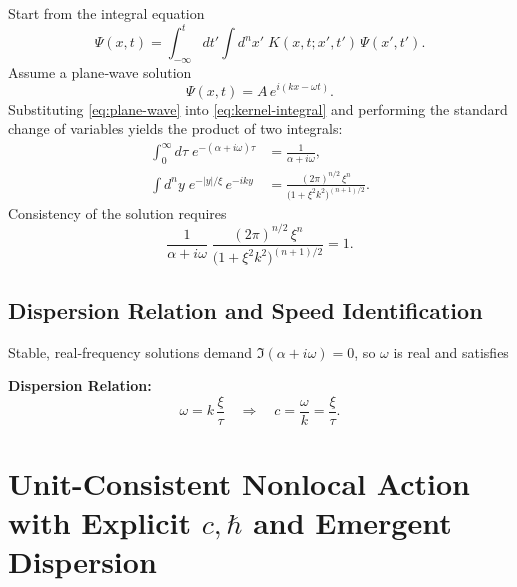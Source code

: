 Start from the integral equation
\begin{equation}
  \Psi(x,t)
  = \int_{-\infty}^{t} dt'\int d^n x'\;K(x,t;x',t')\,\Psi(x',t').
  \label{eq:kernel-integral}
\end{equation}
Assume a plane‐wave solution
\begin{equation}
  \Psi(x,t) = A\,e^{i(kx - \omega t)}.
  \label{eq:plane-wave}
\end{equation}
Substituting \eqref{eq:plane-wave} into \eqref{eq:kernel-integral} and performing the standard change of variables yields the product of two integrals:
\begin{align}
  \int_{0}^{\infty} d\tau\;e^{-(\alpha + i\omega)\tau}
  &= \frac{1}{\alpha + i\omega},
  \label{eq:time-int}\\
  \int d^n y\;e^{-|y|/\xi}\,e^{-i k y}
  &= \frac{(2\pi)^{n/2}\,\xi^n}{\bigl(1 + \xi^2 k^2\bigr)^{(n+1)/2}}.
  \label{eq:space-int}
\end{align}
Consistency of the solution requires
\begin{equation}
  \frac{1}{\alpha + i\omega}\;
  \frac{(2\pi)^{n/2}\,\xi^n}{\bigl(1 + \xi^2 k^2\bigr)^{(n+1)/2}}
  = 1.
  \label{eq:dispersion-condition}
\end{equation}

\subsection{Dispersion Relation and Speed Identification}

Stable, real‐frequency solutions demand \(\Im(\alpha + i\omega)=0\), so \(\omega\) is real and satisfies
\begin{framed}
\noindent\textbf{Dispersion Relation:}
\[
  \omega = k\,\frac{\xi}{\tau}
  \quad\Longrightarrow\quad
  c = \frac{\omega}{k} = \frac{\xi}{\tau}.
\]
\end{framed}



\providecommand{\dd}{\mathrm{d}}
\providecommand{\fourint}{\int \dd^4 x}
\providecommand{\fourqint}{\int \frac{\dd^4 q}{(2\pi)^4}}
\providecommand{\Ktil}{\tilde{\mathcal{K}}}
\providecommand{\Kcal}{\mathcal{K}}

\section{Unit-Consistent Nonlocal Action with Explicit \texorpdfstring{$c,\hbar$}{c, ħ} and Emergent Dispersion}

